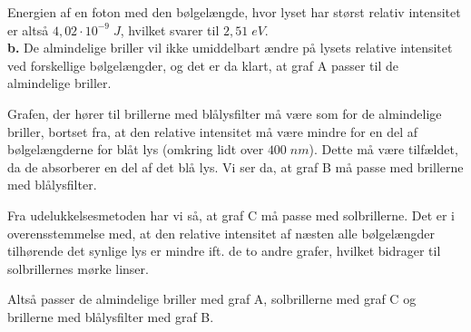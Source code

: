\documentclass{report}
\begin{document}
Energien af en foton med den bølgelængde, hvor lyset har størst relativ intensitet er altså $4,02 \cdot 10 ^{-9}\;\unit{J} $, hvilket svarer til $2,51 \;\unit{eV} $.\\[1ex]
\textbf{b.}
De almindelige briller vil ikke umiddelbart ændre på lysets relative intensitet ved forskellige bølgelængder, og det er da klart, at graf A passer til de almindelige briller.

Grafen, der hører til brillerne med blålysfilter må være som for de almindelige briller, bortset fra, at den relative intensitet må være mindre for en del af bølgelængderne for blåt lys (omkring lidt over $400 \;\unit{nm} $).
Dette må være tilfældet, da de absorberer en del af det blå lys.
Vi ser da, at graf B må passe med brillerne med blålysfilter.

Fra udelukkelsesmetoden har vi så, at graf C må passe med solbrillerne.
Det er i overensstemmelse med, at den relative intensitet af næsten alle bølgelængder tilhørende det synlige lys er mindre ift. de to andre grafer, hvilket bidrager til solbrillernes mørke linser.

Altså passer de almindelige briller med graf A, solbrillerne med graf C og brillerne med blålysfilter med graf B.
\end{document}
